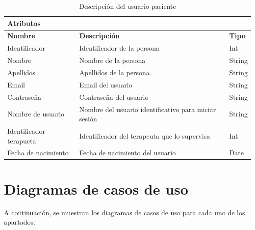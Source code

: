 \begin{table}[H]
    \centering
    \begin{tabularx}{\textwidth}{|p{2.5cm}|X|p{1.5cm}|}
        \hline
        \multicolumn{3}{|l|}{\textbf{Atributos}} \\       
        \hline
        \textbf{Nombre} & \textbf{Descripción} & \textbf{Tipo} \\
        \hline
        Identificador & Identificador de la persona & Int \\  
        \hline
        Nombre & Nombre de la persona & String\\ 
        \hline
        Apellidos & Apellidos de la persona & String \\ 
        \hline
        Email & Email del usuario & String \\ 
        \hline
        Contraseña & Contraseña del usuario & String \\ 
        \hline
        Nombre de usuario & Nombre del usuario identificativo para iniciar sesión & String \\ 
        \hline
        Identificador terapueta & Identificador del terapeuta que lo supervisa & Int \\ 
        \hline
        Fecha de nacimiento & Fecha de nacimiento del usuario & Date \\ 
        \hline
    \end{tabularx}
    \caption{Descripción del usuario paciente}
    \label{tab:paciente_atributos}
\end{table}

\section{Diagramas de casos de uso}
A continuación, se muestran los diagramas de casos de uso para cada uno de los 
apartados:

